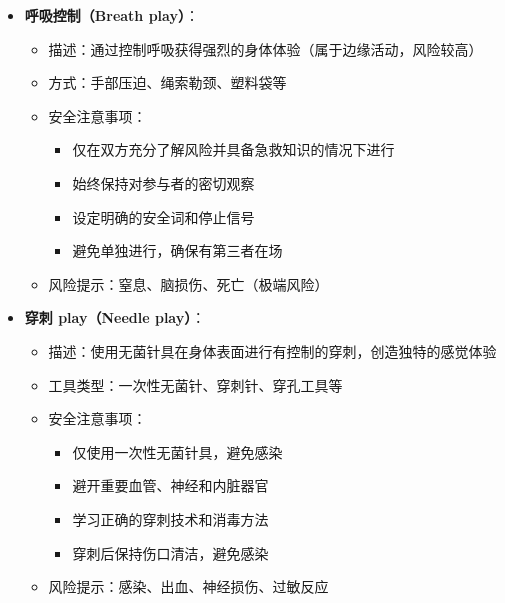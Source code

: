 \documentclass[12pt,UTF8]{ctexbook}
\begin{document}
\begin{itemize}
\begin{itemize}
      \begin{itemize}
      \item 测试物品的温度，避免烫伤或冻伤
      \item 选择专门的低温蜡烛（熔点在50-60℃）
      \item 避免将热蜡滴在敏感部位（如眼睛、黏膜、乳头）
      \item 不要将冰块直接放在皮肤上过长时间
      \end{itemize}
    \item 风险提示：烫伤、冻伤、皮肤过敏
    \end{itemize}
  \item \textbf{呼吸控制（Breath play）}：
    \begin{itemize}
    \item 描述：通过控制呼吸获得强烈的身体体验（属于边缘活动，风险较高）
    \item 方式：手部压迫、绳索勒颈、塑料袋等
    \item 安全注意事项：
      \begin{itemize}
      \item 仅在双方充分了解风险并具备急救知识的情况下进行
      \item 始终保持对参与者的密切观察
      \item 设定明确的安全词和停止信号
      \item 避免单独进行，确保有第三者在场
      \end{itemize}
    \item 风险提示：窒息、脑损伤、死亡（极端风险）
    \end{itemize}
  \item \textbf{穿刺 play（Needle play）}：
    \begin{itemize}
    \item 描述：使用无菌针具在身体表面进行有控制的穿刺，创造独特的感觉体验
    \item 工具类型：一次性无菌针、穿刺针、穿孔工具等
    \item 安全注意事项：
      \begin{itemize}
      \item 仅使用一次性无菌针具，避免感染
      \item 避开重要血管、神经和内脏器官
      \item 学习正确的穿刺技术和消毒方法
      \item 穿刺后保持伤口清洁，避免感染
      \end{itemize}
    \item 风险提示：感染、出血、神经损伤、过敏反应

\end{itemize}
\end{itemize}
\end{document}
